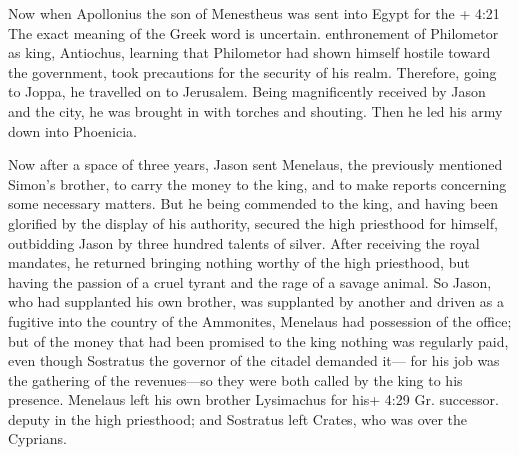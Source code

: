  Now when Apollonius the son of Menestheus was sent into
Egypt for the + 4:21 The exact meaning of the Greek word is uncertain.
enthronement of Philometor as king, Antiochus, learning that Philometor
had shown himself hostile toward the government, took precautions for
the security of his realm. Therefore, going to Joppa, he travelled on to
Jerusalem.  Being magnificently received by Jason and the
city, he was brought in with torches and shouting. Then he led his army
down into Phoenicia.

 Now after a space of three years, Jason sent Menelaus, the
previously mentioned Simon's brother, to carry the money to the king,
and to make reports concerning some necessary matters.  But
he being commended to the king, and having been glorified by the display
of his authority, secured the high priesthood for himself, outbidding
Jason by three hundred talents of silver.  After receiving
the royal mandates, he returned bringing nothing worthy of the high
priesthood, but having the passion of a cruel tyrant and the rage of a
savage animal.  So Jason, who had supplanted his own
brother, was supplanted by another and driven as a fugitive into the
country of the Ammonites,  Menelaus had possession of the
office; but of the money that had been promised to the king nothing was
regularly paid, even though Sostratus the governor of the citadel
demanded it---  for his job was the gathering of the
revenues---so they were both called by the king to his presence.
 Menelaus left his own brother Lysimachus for his+ 4:29 Gr.
successor. deputy in the high priesthood; and Sostratus left Crates, who
was over the Cyprians.

